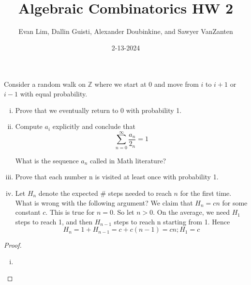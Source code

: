 \documentclass[11pt]{scrartcl}
\title{Algebraic Combinatorics HW 2}
\author{Evan Lim, Dallin Guisti, Alexander Doubinkine, and Sawyer VanZanten}
\date{2-13-2024}
\begin{document}
\maketitle
\setcounter{section}{1}
\begin{problem}
    Consider a random walk on $\mathbb{Z}$ where we start at 0 and move from $i$ to $i + 1$ or $i - 1$ with equal probability.

    \begin{enumerate}[(i)]
        \item Prove that we eventually return to 0 with probability 1.
        \item Compute $a_i$ explicitly and conclude that
        \[
            \sum_{n=0}^{\infty} \frac{a_n}{2_n} = 1
        \]

        What is the sequence ${a_n}$ called in Math literature?
        \item Prove that each number n is visited at least once with probability 1.
        \item Let $H_n$ denote the expected \# steps needed to reach $n$ for the first time. What is wrong with the
        following argument?
        We claim that $H_n = cn$ for some constant $c$. This is true for $n = 0$. So let $n > 0$. On the average, we need $H_1$ steps to reach 1, and then $H_{n-1}$ steps to reach n starting from 1. Hence
        \[
            H_n = 1 + H_{n-1} = c + c(n-1) = cn ; H_1 = c
        \]
    \end{enumerate}
\end{problem}
\begin{proof}
    \begin{enumerate}[(i)]
        \item 
    \end{enumerate}
\end{proof}
\end{document}
